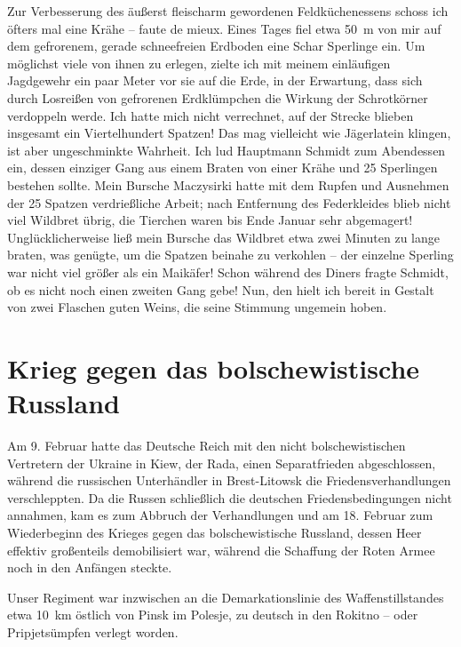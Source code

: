 Zur Verbesserung des äußerst fleischarm gewordenen Feldküchenessens schoss ich öfters mal eine Krähe -- faute de mieux. Eines Tages fiel etwa 50~m von mir auf dem gefrorenem, gerade schneefreien Erdboden eine Schar Sperlinge ein. Um möglichst viele von ihnen zu erlegen, zielte ich mit meinem einläufigen Jagdgewehr ein paar Meter vor sie auf die Erde, in der Erwartung, dass sich durch Losreißen von gefrorenen Erdklümpchen die Wirkung der Schrotkörner verdoppeln werde. Ich hatte mich nicht verrechnet, auf der Strecke blieben insgesamt ein Viertelhundert Spatzen! Das mag vielleicht wie Jägerlatein klingen, ist aber  ungeschminkte Wahrheit. Ich lud Hauptmann Schmidt zum Abendessen ein, dessen einziger Gang aus einem Braten von einer Krähe und 25 Sperlingen bestehen sollte. Mein Bursche Maczysirki hatte mit dem Rupfen und Ausnehmen der 25 Spatzen verdrießliche Arbeit; nach Entfernung des Federkleides blieb nicht viel Wildbret übrig, die Tierchen waren bis Ende Januar sehr abgemagert! Unglücklicherweise ließ mein Bursche das Wildbret etwa zwei Minuten zu lange braten, was genügte, um die Spatzen beinahe zu verkohlen -- der einzelne Sperling war nicht viel größer als ein Maikäfer! Schon während des Diners fragte Schmidt, ob es nicht noch einen zweiten Gang gebe! Nun, den hielt ich bereit in Gestalt von zwei Flaschen guten Weins, die seine Stimmung ungemein hoben.

\section{Krieg gegen das bolschewistische Russland}
Am 9. Februar hatte das Deutsche Reich mit den nicht bolschewistischen Vertretern der Ukraine in Kiew, der Rada, einen Separatfrieden abgeschlossen, während die russischen Unterhändler in Brest-Litowsk die Friedensverhandlungen verschleppten. Da die Russen schließlich die deutschen Friedensbedingungen nicht annahmen, kam es zum Abbruch der Verhandlungen und am 18. Februar zum Wiederbeginn des Krieges gegen das bolschewistische Russland, dessen Heer effektiv großenteils demobilisiert war, während die Schaffung der Roten Armee noch in den Anfängen steckte.

Unser Regiment war inzwischen an die Demarkationslinie des Waffenstillstandes etwa 10~km östlich von Pinsk im Polesje, zu deutsch in den Rokitno -- oder Pripjetsümpfen verlegt worden.


